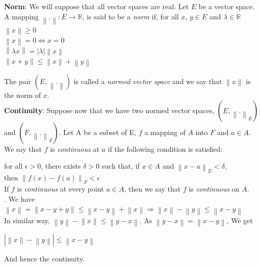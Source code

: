 \documentclass[12 pt]{article}
\theoremstyle{definition}
\theoremstyle{remark}
\newcommand\norm[1]{\left\lVert#1\right\rVert}
\begin{document}
\textbf{Norm}:
We will suppose that all vector spaces are real. Let $E$ be a vector space. A mapping $ \norm{.}: E\rightarrow \mathbb{R} $, is said to be a \textit{norm} if, for all $\textit{x, y} \in E$ and $\lambda \in \mathbb{R}$ 
\\
\hspace*{2cm} $\norm{x}\geq 0$\\
\hspace*{2cm} $\norm{x} = 0 \Leftrightarrow x = 0$\\
\hspace*{2cm} $\norm{\lambda x} = |\lambda|\norm{x}$\\ 
\hspace*{2cm} $\norm{x + y} \leq \norm{x} + \norm{y}$
 
The pair $(E, \norm{.})$ is called a \textit{normed vector space} and we say that $\norm{x}$ is the norm
of $x$.\\

\textbf{Continuity}: Suppose now that we have two normed vector spaces, $(E, \norm{.}_{E})$ and $(F, \norm{.}_{F})$. Let A be a subset of E, $ f $ a mapping of $A$ into $F$ and $a \in A$. We say that $f$ is \textit{continuous} at $a$ if the following condition is satisfied: \par
for all $\epsilon > 0$, there exists $\delta > 0$ such that, if $x \in A$ and $\norm{x-a}_{E} < \delta$,\\ then $\norm{f(x) - f(a)}_{F} < \epsilon$ \\
If $f$ is \textit{continuous} at every point $a \in A$, then we say that $f$ is \textit{continuous} on $A$.\\

.
\normalfont
\proof We have 
$\norm{x} = \norm{x-y+y} \leq \norm{x-y} + \norm{x} \Rightarrow \norm{x} - \norm{y} \leq \norm{x-y}$\\
In similar way,  $\norm{y} - \norm{x} \leq \norm{y-x}.$ As $\norm{y-x} = \norm{x-y}$, We get
\begin{center}
$|\norm{x}-\norm{y}| \leq \norm{x-y}$
\end{center} 
And hence the continuity.\\

\end{document}
